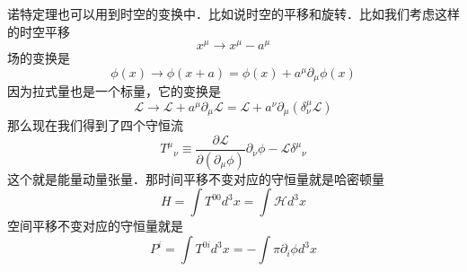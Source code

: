 诺特定理也可以用到时空的变换中．比如说时空的平移和旋转．比如我们考虑这样的时空平移
\begin{equation}
x^\mu \rightarrow x^\mu - a^\mu 
\end{equation}
场的变换是
\begin{equation}
\phi(x) \rightarrow \phi (x+a) = \phi (x) + a^\mu \partial_\mu \phi(x)
\end{equation}
因为拉式量也是一个标量，它的变换是
\begin{equation}
\mathcal L \rightarrow \mathcal L + a^\mu \partial_\mu \mathcal L  = \mathcal L + a^\nu \partial_\mu (\delta^\mu_\nu \mathcal L)
\end{equation}
那么现在我们得到了四个守恒流
\begin{equation}
T^\mu{}_\nu \equiv \frac{\partial \mathcal L}{\partial (\partial_\mu \phi)} \partial_\nu \phi - \mathcal L \delta^\mu{}_\nu
\end{equation}
这个就是能量动量张量．那时间平移不变对应的守恒量就是哈密顿量
\begin{equation}
H = \int T^{00} d^3 x = \int \mathcal H d^3 x
\end{equation}
空间平移不变对应的守恒量就是
\begin{equation}
P^i = \int T^{0i} d^3x = - \int \pi \partial_i \phi d^3 x 
\end{equation}
















